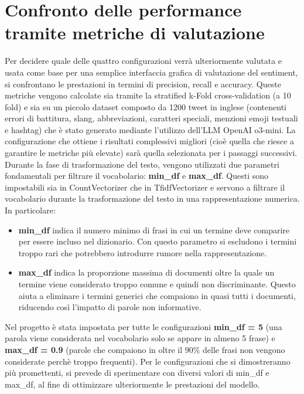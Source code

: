 \documentclass[12pt,a4paper]{report} %
\begin{document}
\section{Confronto delle performance tramite metriche di valutazione}
Per decidere quale delle quattro configurazioni  verrà ulteriormente valutata e usata come base per una semplice interfaccia grafica di valutazione del sentiment, si confrontano le prestazioni in termini di precision, recall e accuracy. Queste metriche vengono calcolate sia tramite la stratified k-Fold cross-validation (a 10 fold) e sia su un piccolo dataset composto da 1200 tweet in inglese (contenenti errori di battitura, slang, abbreviazioni, caratteri speciali, menzioni emoji testuali e hashtag) che è stato generato mediante l'utilizzo dell'LLM OpenAI o3-mini. La configurazione che ottiene i risultati complessivi migliori (cioè quella che riesce a garantire le metriche più elevate) sarà quella selezionata per i passaggi successivi. 
Durante la fase di trasformazione del testo, vengono utilizzati due parametri fondamentali per filtrare il vocabolario: \textbf{min\_df} e \textbf{max\_df}. Questi sono impostabili sia in CountVectorizer che in TfidfVectorizer e servono a filtrare il vocabolario durante la trasformazione del testo in una rappresentazione numerica. In particolare: 
\begin{itemize}
    \item \textbf{min\_df} indica il numero minimo di frasi in cui un termine deve comparire per essere incluso nel dizionario. Con questo parametro si escludono i termini troppo rari che potrebbero introdurre rumore nella rappresentazione.
    \item  \textbf{max\_df} indica la proporzione massima di documenti oltre la quale un termine viene considerato troppo comune e quindi non discriminante. Questo aiuta a eliminare i termini generici che compaiono in quasi tutti i documenti, riducendo così l’impatto di parole non informative.
\end{itemize}
Nel progetto è stata impostata per tutte le configurazioni \textbf{min\_df = 5} (una parola viene considerata nel vocabolario solo se appare in almeno 5 frase) e \textbf{max\_df = 0.9} (parole che compaiono in oltre il 90\% delle frasi non vengono considerate perchè troppo frequenti). Per le configurazioni che si dimostreranno più promettenti, si prevede di sperimentare con diversi valori di min\_df e max\_df, al fine di ottimizzare ulteriormente le prestazioni del modello. 
\end{document}
